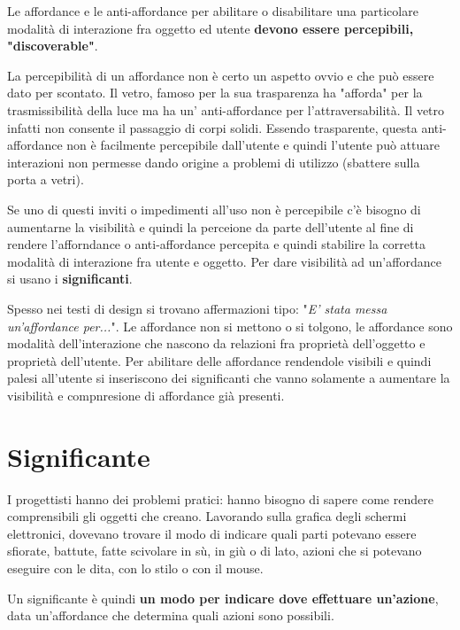 Le affordance e le anti-affordance per abilitare o disabilitare una particolare modalità di interazione fra oggetto ed utente \textbf{devono essere percepibili, "discoverable"}.

La percepibilità di un affordance non è certo un aspetto ovvio e che può essere dato per scontato. Il vetro, famoso per la sua trasparenza ha "afforda" per la trasmissibilità della luce ma ha un' anti-affordance per l'attraversabilità. Il vetro infatti non consente il passaggio di corpi solidi. Essendo trasparente, questa anti-affordance non è facilmente percepibile dall'utente e quindi l'utente può attuare interazioni non permesse dando origine a problemi di utilizzo (sbattere sulla porta a vetri).

Se uno di questi inviti o impedimenti all'uso non è percepibile c'è bisogno di aumentarne la visibilità e quindi la perceione da parte dell'utente al fine di rendere l'afforndance o anti-affordance percepita e quindi stabilire la corretta modalità di interazione fra utente e oggetto. Per dare visibilità ad un'affordance si usano i \textbf{significanti}.

Spesso nei testi di design si trovano affermazioni tipo: "\textit{E' stata messa un'affordance per...}". Le affordance non si mettono o si tolgono, le affordance sono modalità dell'interazione che nascono da relazioni fra proprietà dell'oggetto e proprietà dell'utente. Per abilitare delle affordance rendendole visibili e quindi palesi all'utente si inseriscono dei significanti che vanno solamente a aumentare la visibilità e compnresione di affordance già presenti.

\section{Significante}
I progettisti hanno dei problemi pratici: hanno bisogno di sapere come rendere comprensibili gli oggetti che creano. Lavorando sulla grafica degli schermi elettronici, dovevano trovare il modo di indicare quali parti potevano essere sfiorate, battute, fatte scivolare in sù, in giù o di lato, azioni che si potevano eseguire con le dita, con lo stilo o con il mouse.

Un significante è quindi \textbf{un modo per indicare dove effettuare un'azione}, data un'affordance che determina quali azioni sono possibili.

